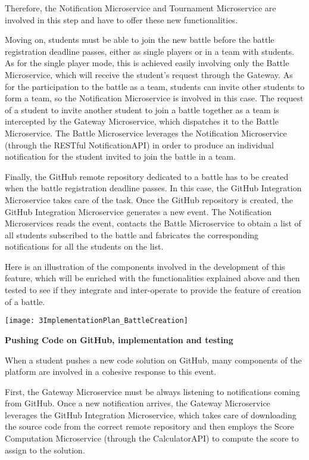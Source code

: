 Therefore, the Notification Microservice and Tournament Microservice are involved in this step and have to offer these new functionalities.

Moving on, students must be able to join the new battle before the battle registration deadline passes, either as single players or in a team with students. As for the single player mode, this is achieved easily involving only the Battle Microservice, which will receive the student's request through the Gateway.
As for the participation to the battle as a team, students can invite other students to form a team, so the Notification Microservice is involved in this case. The request of a student to invite another student to join a battle together as a team is intercepted by the Gateway Microservice, which dispatches it to the Battle Microservice. The Battle Microservice leverages the Notification Microservice (through the RESTful NotificationAPI) in order to produce an individual notification for the student invited to join the battle in a team.

Finally, the GitHub remote repository dedicated to a battle has to be created when the battle registration deadline passes. In this case, the GitHub Integration Microservice takes care of the task. Once the GitHub repository is created, the GitHub Integration Microservice generates a new event. The Notification Microservices reads the event, contacts the Battle Microservice to obtain a list of all students subscribed to the battle and fabricates the corresponding notifications for all the students on the list.

Here is an illustration of the components involved in the development of this feature, which will be enriched with the functionalities explained above and then tested to see if they integrate and inter-operate to provide the feature of creation of a battle.

\begin{center}
	\texttt{[image: 3ImplementationPlan\_BattleCreation]}
\end{center}

\vspace{0.7cm}

\textbf{Pushing Code on GitHub, implementation and testing}

When a student pushes a new code solution on GitHub, many components of the \app platform are involved in a cohesive response to this event.

First, the Gateway Microservice must be always listening to notifications coming from GitHub. Once a new notification arrives, the Gateway Microservice leverages the GitHub Integration Microservice, which takes care of downloading the source code from the correct remote repository and then employs the Score Computation Microservice (through the CalculatorAPI) to compute the score to assign to the solution.

